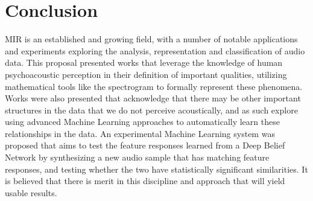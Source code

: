 \documentclass[12pt]{article}
\begin{document}

\section{Conclusion}
MIR is an established and growing field, with a number of notable applications and experiments exploring the analysis, representation and classification of audio data. This proposal presented works that leverage the knowledge of human psychoacoustic perception in their definition of important qualities, utilizing mathematical tools like the spectrogram to formally represent these phenomena. Works were also presented that acknowledge that there may be other important structures in the data that we do not perceive acoustically, and as such explore using advanced Machine Learning approaches to automatically learn these relationships in the data. An experimental Machine Learning system was proposed that aims to test the feature responses learned from a Deep Belief Network by synthesizing a new audio sample that has matching feature responses, and testing whether the two have statistically significant similarities. It is believed that there is merit in this discipline and approach that will yield usable results.

{}

\end{document}
